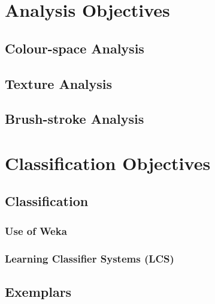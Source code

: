 \section{Analysis Objectives}

\subsection{Colour-space Analysis}

\subsection{Texture Analysis}

\subsection{Brush-stroke Analysis}


\section{Classification Objectives}

\subsection{Classification}

\subsubsection{Use of Weka}

\subsubsection{Learning Classifier Systems (LCS)}

\subsection{Exemplars}



